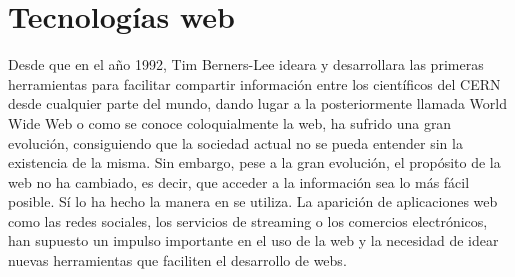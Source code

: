 \section{Tecnologías web}
Desde que en el año 1992, Tim Berners-Lee ideara y desarrollara las primeras herramientas para facilitar compartir información entre los científicos del CERN desde cualquier parte del mundo, dando lugar a la posteriormente llamada World Wide Web o como se conoce coloquialmente la web, ha sufrido una gran evolución, consiguiendo que la sociedad actual no se pueda entender sin la existencia de la misma. Sin embargo, pese a la gran evolución, el propósito de la web no ha cambiado, es decir, que acceder a la información sea lo más fácil posible. Sí lo ha hecho la manera en se utiliza. La aparición de aplicaciones web como las redes sociales, los servicios de streaming o los comercios electrónicos, han supuesto un impulso importante en el uso de la web y la necesidad de idear nuevas herramientas que faciliten el desarrollo de webs.

